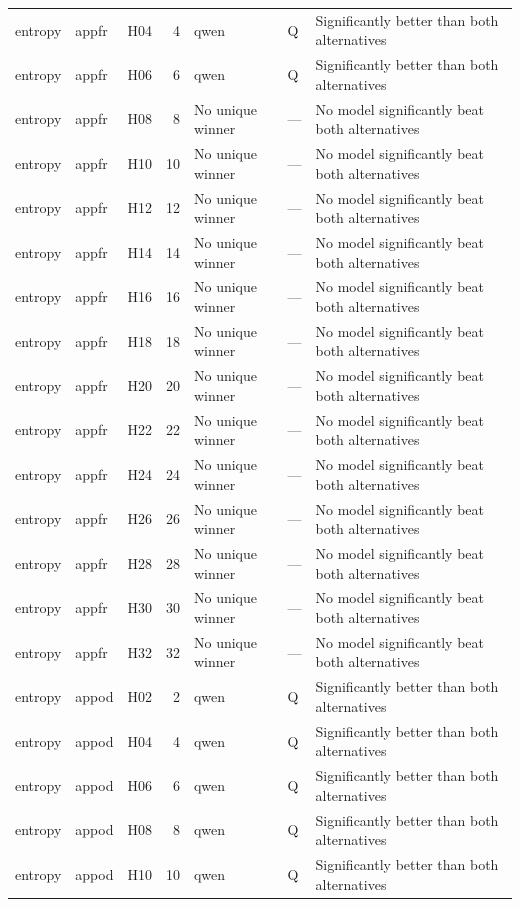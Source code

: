 \begin{longtable}{lllrlll}
entropy & appfr & H04 & 4 & qwen & Q & Significantly better than both alternatives \\
entropy & appfr & H06 & 6 & qwen & Q & Significantly better than both alternatives \\
entropy & appfr & H08 & 8 & No unique winner & — & No model significantly beat both alternatives \\
entropy & appfr & H10 & 10 & No unique winner & — & No model significantly beat both alternatives \\
entropy & appfr & H12 & 12 & No unique winner & — & No model significantly beat both alternatives \\
entropy & appfr & H14 & 14 & No unique winner & — & No model significantly beat both alternatives \\
entropy & appfr & H16 & 16 & No unique winner & — & No model significantly beat both alternatives \\
entropy & appfr & H18 & 18 & No unique winner & — & No model significantly beat both alternatives \\
entropy & appfr & H20 & 20 & No unique winner & — & No model significantly beat both alternatives \\
entropy & appfr & H22 & 22 & No unique winner & — & No model significantly beat both alternatives \\
entropy & appfr & H24 & 24 & No unique winner & — & No model significantly beat both alternatives \\
entropy & appfr & H26 & 26 & No unique winner & — & No model significantly beat both alternatives \\
entropy & appfr & H28 & 28 & No unique winner & — & No model significantly beat both alternatives \\
entropy & appfr & H30 & 30 & No unique winner & — & No model significantly beat both alternatives \\
entropy & appfr & H32 & 32 & No unique winner & — & No model significantly beat both alternatives \\
entropy & appod & H02 & 2 & qwen & Q & Significantly better than both alternatives \\
entropy & appod & H04 & 4 & qwen & Q & Significantly better than both alternatives \\
entropy & appod & H06 & 6 & qwen & Q & Significantly better than both alternatives \\
entropy & appod & H08 & 8 & qwen & Q & Significantly better than both alternatives \\
entropy & appod & H10 & 10 & qwen & Q & Significantly better than both alternatives \\

\end{longtable}
